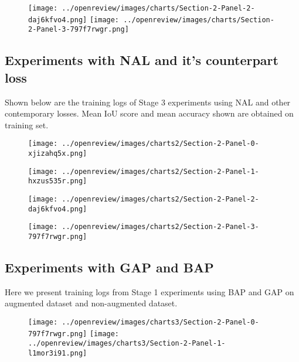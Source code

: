 \begin{figure}[!htb]
\vspace{10mm}
\texttt{[image: ../openreview/images/charts/Section-2-Panel-2-daj6kfvo4.png]}
\endminipage\hfill
{}
\texttt{[image: ../openreview/images/charts/Section-2-Panel-3-797f7rwgr.png]}
\endminipage
\end{figure}


\newpage
\subsection{Experiments with NAL and it's counterpart loss}
Shown below are the training logs of Stage 3 experiments using NAL and other contemporary losses. Mean IoU score and mean accuracy shown are obtained on training set.

\begin{figure}[!htb]
\vspace{10mm}
\texttt{[image: ../openreview/images/charts2/Section-2-Panel-0-xjizahq5x.png]}

\endminipage\hfill
{}
\texttt{[image: ../openreview/images/charts2/Section-2-Panel-1-hxzus535r.png]}

\endminipage
\end{figure}

\begin{figure}[!htb]
\vspace{10mm}
\texttt{[image: ../openreview/images/charts2/Section-2-Panel-2-daj6kfvo4.png]}

\endminipage\hfill
{}
\texttt{[image: ../openreview/images/charts2/Section-2-Panel-3-797f7rwgr.png]}

\endminipage
\end{figure}


\newpage
\subsection{Experiments with GAP and BAP}
Here we present training logs from Stage 1 experiments using BAP and GAP on augmented dataset and non-augmented dataset.

\begin{figure}[!htb]
\vspace{10mm}
\texttt{[image: ../openreview/images/charts3/Section-2-Panel-0-797f7rwgr.png]}
\endminipage\hfill
{}
\texttt{[image: ../openreview/images/charts3/Section-2-Panel-1-l1mor3i91.png]}
\endminipage
\end{figure}

